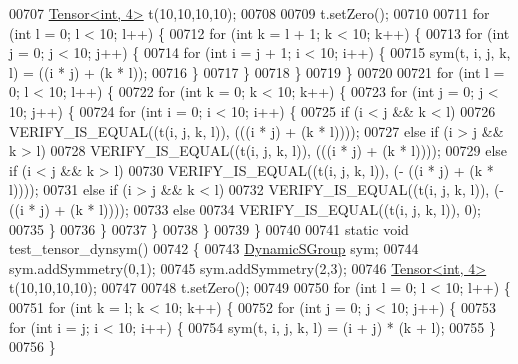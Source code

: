 \begin{DoxyCode}
00707   \hyperlink{class_eigen_1_1_tensor}{Tensor<int, 4>} t(10,10,10,10);
00708 
00709   t.setZero();
00710 
00711   \textcolor{keywordflow}{for} (\textcolor{keywordtype}{int} l = 0; l < 10; l++) \{
00712     \textcolor{keywordflow}{for} (\textcolor{keywordtype}{int} k = l + 1; k < 10; k++) \{
00713       \textcolor{keywordflow}{for} (\textcolor{keywordtype}{int} j = 0; j < 10; j++) \{
00714         \textcolor{keywordflow}{for} (\textcolor{keywordtype}{int} i = j + 1; i < 10; i++) \{
00715           sym(t, i, j, k, l) = ((i * j) + (k * l));
00716         \}
00717       \}
00718     \}
00719   \}
00720 
00721   \textcolor{keywordflow}{for} (\textcolor{keywordtype}{int} l = 0; l < 10; l++) \{
00722     \textcolor{keywordflow}{for} (\textcolor{keywordtype}{int} k = 0; k < 10; k++) \{
00723       \textcolor{keywordflow}{for} (\textcolor{keywordtype}{int} j = 0; j < 10; j++) \{
00724         \textcolor{keywordflow}{for} (\textcolor{keywordtype}{int} i = 0; i < 10; i++) \{
00725           \textcolor{keywordflow}{if} (i < j && k < l)
00726             VERIFY\_IS\_EQUAL((t(i, j, k, l)), (((i * j) + (k * l))));
00727           \textcolor{keywordflow}{else} \textcolor{keywordflow}{if} (i > j && k > l)
00728             VERIFY\_IS\_EQUAL((t(i, j, k, l)), (((i * j) + (k * l))));
00729           \textcolor{keywordflow}{else} \textcolor{keywordflow}{if} (i < j && k > l)
00730             VERIFY\_IS\_EQUAL((t(i, j, k, l)), (- ((i * j) + (k * l))));
00731           \textcolor{keywordflow}{else} \textcolor{keywordflow}{if} (i > j && k < l)
00732             VERIFY\_IS\_EQUAL((t(i, j, k, l)), (- ((i * j) + (k * l))));
00733           \textcolor{keywordflow}{else}
00734             VERIFY\_IS\_EQUAL((t(i, j, k, l)), 0);
00735         \}
00736       \}
00737     \}
00738   \}
00739 \}
00740 
00741 \textcolor{keyword}{static} \textcolor{keywordtype}{void} test\_tensor\_dynsym()
00742 \{
00743   \hyperlink{class_eigen_1_1_dynamic_s_group}{DynamicSGroup} sym;
00744   sym.addSymmetry(0,1);
00745   sym.addSymmetry(2,3);
00746   \hyperlink{class_eigen_1_1_tensor}{Tensor<int, 4>} t(10,10,10,10);
00747 
00748   t.setZero();
00749 
00750   \textcolor{keywordflow}{for} (\textcolor{keywordtype}{int} l = 0; l < 10; l++) \{
00751     \textcolor{keywordflow}{for} (\textcolor{keywordtype}{int} k = l; k < 10; k++) \{
00752       \textcolor{keywordflow}{for} (\textcolor{keywordtype}{int} j = 0; j < 10; j++) \{
00753         \textcolor{keywordflow}{for} (\textcolor{keywordtype}{int} i = j; i < 10; i++) \{
00754           sym(t, i, j, k, l) = (i + j) * (k + l);
00755         \}
00756       \}

\end{DoxyCode}
